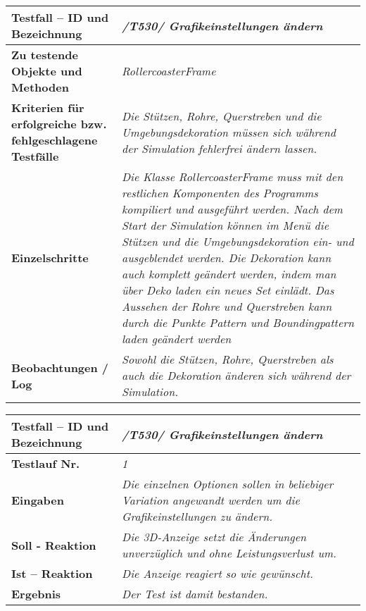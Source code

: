 \begin{longtable}{|p{7cm}|p{10cm}|}
\hline
\textbf{Testfall -- ID und Bezeichnung} &  \textit{/T530/ Grafikeinstellungen ändern} \\
\hline
\textbf{Zu testende Objekte und Methoden} &  \textit{RollercoasterFrame}
\\
\hline
\textbf{Kriterien für erfolgreiche bzw. fehlgeschlagene Testfälle} &
\textit{Die Stützen, Rohre, Querstreben und die Umgebungsdekoration müssen sich während der Simulation fehlerfrei ändern lassen.} \\
\hline
\textbf{Einzelschritte} &  \textit{Die Klasse RollercoasterFrame muss mit den restlichen Komponenten des Programms kompiliert und ausgeführt werden. Nach dem Start der Simulation können im Menü
die Stützen und die Umgebungsdekoration ein- und ausgeblendet werden. Die Dekoration kann auch komplett geändert werden, indem man über Deko laden ein neues Set einlädt. Das Aussehen der
Rohre und Querstreben kann durch die Punkte Pattern und Boundingpattern laden geändert werden} \\
\hline
\textbf{Beobachtungen / Log} &  \textit{Sowohl die Stützen, Rohre, Querstreben als auch die Dekoration änderen sich während der Simulation.} \\
\hline
\end{longtable}

\begin{longtable}{|p{7cm}|p{10cm}|}
\hline
\textbf{Testfall -- ID und Bezeichnung} & \textit{ /T530/ Grafikeinstellungen ändern} \\
\hline
\textbf{Testlauf Nr.} & \textit{1} \\
\hline
\textbf{Eingaben} & \textit{Die einzelnen Optionen sollen in beliebiger Variation angewandt werden um die Grafikeinstellungen zu ändern.} \\
\hline
\textbf{Soll - Reaktion} & \textit{Die 3D-Anzeige setzt die Änderungen unverzüglich und ohne Leistungsverlust um.} \\
\hline
\textbf{Ist -- Reaktion} & \textit{Die Anzeige reagiert so wie gewünscht.} \\
\hline
\textbf{Ergebnis} & \textit{Der Test ist damit bestanden.} \\
\hline
\end{longtable}


